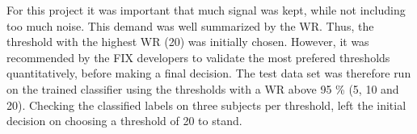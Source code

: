 For this project it was important that much signal was kept, while not including too much noise. This demand was well summarized by the WR. Thus, the threshold with the highest WR (20) was initially chosen. However, it was recommended by the FIX developers to validate the most prefered thresholds quantitatively, before making a final decision. The test data set was therefore run on the trained classifier using the thresholds with a WR above 95 \% (5, 10 and 20). Checking the classified labels on three subjects per threshold, left the initial decision on choosing a threshold of 20 to stand.
